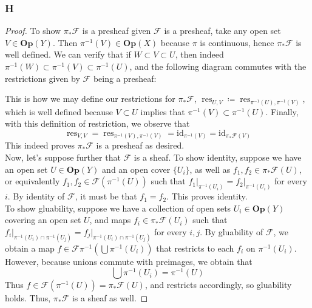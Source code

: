 \documentclass{article}
\newcommand{\id}{\mathrm{id}}
\newcommand{\fF}{\mathscr{F}}
\newcommand{\Op}{\mathbf{Op}} %
\DeclareMathOperator{\res}{\mathrm{res}}
\begin{document}
\subsubsection{H}\label{2.2.H}
\begin{proof}
    To show $\pi_* \fF$ is a presheaf given $\fF$ is a presheaf, take any open set $V\in \Op(Y)$. Then $\pi^{-1}(V)\in \Op(X)$ because $\pi$ is continuous, hence $\pi_* \fF$ is well defined. We can verify that if $W\subset V\subset U$, then indeed $\pi^{-1}(W)\subset \pi^{-1}(V)\subset \pi^{-1}(U)$, and the following diagram commutes with the restrictions given by $\fF$ being a presheaf:
    \begin{center}
    \end{center}
    This is how we may define our restrictions for $\pi_* \fF$, $\res_{U,V}\coloneqq \res_{\pi^{-1}(U),\pi^{-1}(V)}$, which is well defined because $V\subset U$ implies that $\pi^{-1}(V)\subset \pi^{-1}(U)$. Finally, with this definition of restriction, we observe that
    \[\res_{V,V}=\res_{\pi^{-1}(V),\pi^{-1}(V)}=\id_{\pi^{-1}(V)}=\id_{\pi_\ast\fF(V)}
    \]
    This indeed proves $\pi_*\fF$ is a presheaf as desired.\\
    \indent Now, let's suppose further that $\fF$ is a sheaf. To show identity, suppose we have an open set $U\in \Op(Y)$ and an open cover $\{U_i\}$, as well as $f_1,f_2\in \pi_*\fF(U)$, or equivalently $f_1,f_2\in \fF(\pi^{-1}(U))$ such that $f_1\vert_{\pi^{-1}(U_i)}=f_2\vert_{\pi^{-1}(U_i)}$ for every $i$. By identity of $\fF$, it must be that $f_1=f_2$. This proves identity.\\
    \indent To show gluability, suppose we have a collection of open sets $U_i\in \Op(Y)$ covering an open set $U$, and maps $f_i\in \pi_* \fF(U_i)$ such that $f_i\vert_{\pi^{-1}(U_i)\cap \pi^{-1}(U_j)}=f_j\vert_{\pi^{-1}(U_i)\cap \pi^{-1}(U_j)}$ for every $i,j$. By gluability of $\fF$, we obtain a map $f\in \fF \pi^{-1}(\bigcup \pi^{-1}(U_i))$ that restricts to each $f_i$ on $\pi^{-1}(U_i)$. However, because unions commute with preimages, we obtain that
    \[
    \bigcup \pi^{-1}(U_i)=\pi^{-1}(U)
    \]
    Thus $f\in \fF(\pi^{-1}(U))=\pi_*\fF(U)$, and restricts accordingly, so gluability holds. Thus, $\pi_*\fF$ is a sheaf as well.
\end{proof}
\end{document}
